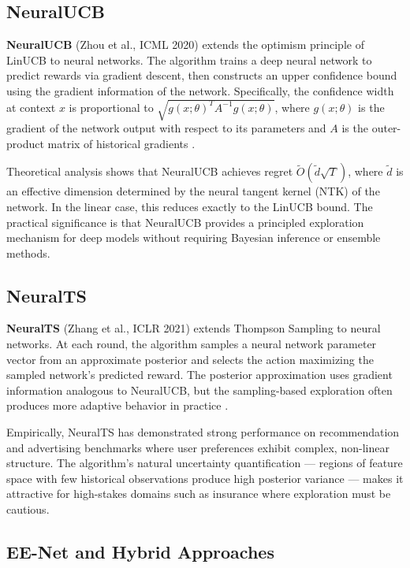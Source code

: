 \subsection{NeuralUCB}\label{neuralucb}

\textbf{NeuralUCB} (Zhou et al., ICML 2020) extends the optimism principle of LinUCB to neural networks. The algorithm trains a deep neural network to predict rewards via gradient descent, then constructs an upper confidence bound using the gradient information of the network. Specifically, the confidence width at context \(x\) is proportional to \(\sqrt{g(x; \theta)^T A^{-1} g(x; \theta)}\), where \(g(x; \theta)\) is the gradient of the network output with respect to its parameters and \(A\) is the outer-product matrix of historical gradients \citep{Zhou2020}.

Theoretical analysis shows that NeuralUCB achieves regret \(\tilde{O}(\tilde{d}\sqrt{T})\), where \(\tilde{d}\) is an effective dimension determined by the neural tangent kernel (NTK) of the network. In the linear case, this reduces exactly to the LinUCB bound. The practical significance is that NeuralUCB provides a principled exploration mechanism for deep models without requiring Bayesian inference or ensemble methods.

\subsection{NeuralTS}\label{neuralts}

\textbf{NeuralTS} (Zhang et al., ICLR 2021) extends Thompson Sampling to neural networks. At each round, the algorithm samples a neural network parameter vector from an approximate posterior and selects the action maximizing the sampled network's predicted reward. The posterior approximation uses gradient information analogous to NeuralUCB, but the sampling-based exploration often produces more adaptive behavior in practice \citep{Zhang2021}.

Empirically, NeuralTS has demonstrated strong performance on recommendation and advertising benchmarks where user preferences exhibit complex, non-linear structure. The algorithm's natural uncertainty quantification --- regions of feature space with few historical observations produce high posterior variance --- makes it attractive for high-stakes domains such as insurance where exploration must be cautious.

\subsection{EE-Net and Hybrid Approaches}\label{ee-net-and-hybrid-approaches}

